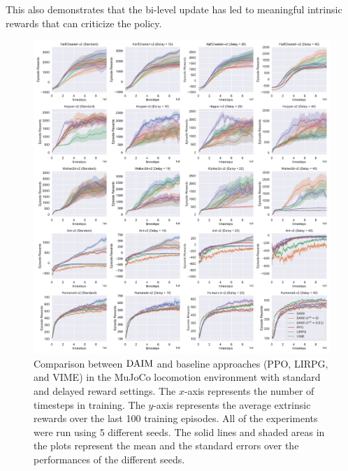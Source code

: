 This also demonstrates that the bi-level update has led to meaningful intrinsic {rewards} that can criticize the policy.
\begin{figure}[t!]
    \centering
    \includegraphics[width=1.0\linewidth]{figures/chapter5/mujoco_result_54_seaborn.pdf}
    \caption[Results of DAIM in the MuJoCo environment with standard and delayed reward settings.]{Comparison between $\text{DAIM}$ and baseline approaches (PPO, LIRPG, and VIME) in the MuJoCo locomotion environment with standard and delayed reward settings. The $x$-axis represents the number of timesteps in training. The $y$-axis represents the average extrinsic rewards over the last 100 training episodes. All of the experiments were run using 5 different seeds. The solid lines and shaded areas in the plots represent the mean and the standard errors over the performances of the different seeds.}
    \label{fig:mujoco_results}
\end{figure}

